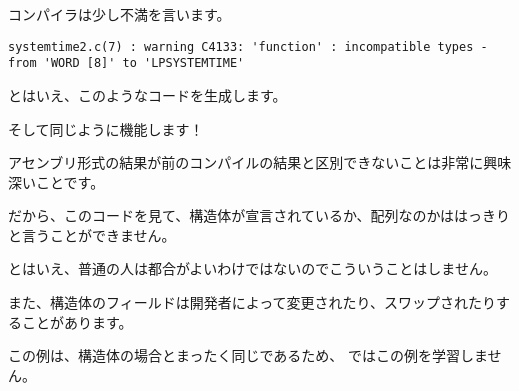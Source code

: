

コンパイラは少し不満を言います。

\begin{lstlisting}
systemtime2.c(7) : warning C4133: 'function' : incompatible types - from 'WORD [8]' to 'LPSYSTEMTIME'
\end{lstlisting}

とはいえ、このようなコードを生成します。



そして同じように機能します！

アセンブリ形式の結果が前のコンパイルの結果と区別できないことは非常に興味深いことです。

だから、このコードを見て、構造体が宣言されているか、配列なのかははっきりと言うことができません。

とはいえ、普通の人は都合がよいわけではないのでこういうことはしません。

また、構造体のフィールドは開発者によって変更されたり、スワップされたりすることがあります。

この例は、構造体の場合とまったく同じであるため、 \olly ではこの例を学習しません。

